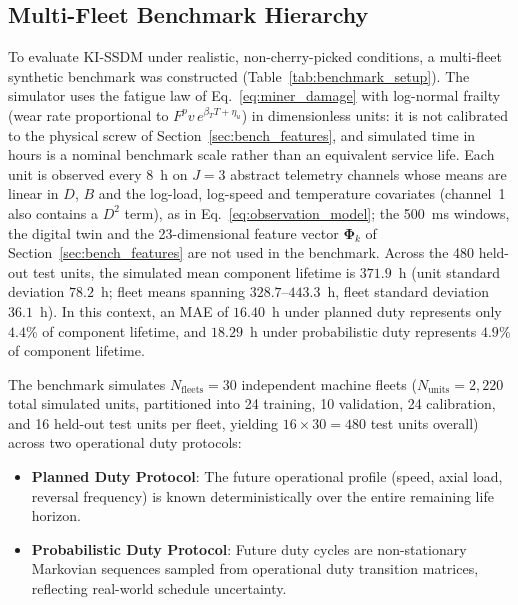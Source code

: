 \documentclass[a4paper,fleqn]{cas-dc}
\newcommand{\bPhi}{\bm{\Phi}}
\begin{document}
\subsection{Multi-Fleet Benchmark Hierarchy}
\label{subsec:fleet_hierarchy}

To evaluate KI-SSDM under realistic, non-cherry-picked conditions, a multi-fleet synthetic benchmark was constructed (Table~\ref{tab:benchmark_setup}). The simulator uses the fatigue law of Eq.~\eqref{eq:miner_damage} with log-normal frailty (wear rate proportional to $F^p v\,e^{\beta_T T + \eta_u}$) in dimensionless units: it is not calibrated to the physical screw of Section~\ref{sec:bench_features}, and simulated time in hours is a nominal benchmark scale rather than an equivalent service life. Each unit is observed every 8~h on $J = 3$ abstract telemetry channels whose means are linear in $D$, $B$ and the log-load, log-speed and temperature covariates (channel~1 also contains a $D^2$ term), as in Eq.~\eqref{eq:observation_model}; the 500~ms windows, the digital twin and the 23-dimensional feature vector $\bPhi_k$ of Section~\ref{sec:bench_features} are not used in the benchmark. Across the 480 held-out test units, the simulated mean component lifetime is $371.9$~h (unit standard deviation $78.2$~h; fleet means spanning $328.7\text{--}443.3$~h, fleet standard deviation $36.1$~h). In this context, an MAE of $16.40$~h under planned duty represents only $4.4\%$ of component lifetime, and $18.29$~h under probabilistic duty represents $4.9\%$ of component lifetime.

The benchmark simulates $N_{\mathrm{fleets}} = 30$ independent machine fleets ($N_{\mathrm{units}} = 2{,}220$ total simulated units, partitioned into 24 training, 10 validation, 24 calibration, and 16 held-out test units per fleet, yielding $16 \times 30 = 480$ test units overall) across two operational duty protocols:
\begin{itemize}[leftmargin=1.5em]
    \item \textbf{Planned Duty Protocol}: The future operational profile (speed, axial load, reversal frequency) is known deterministically over the entire remaining life horizon.
    \item \textbf{Probabilistic Duty Protocol}: Future duty cycles are non-stationary Markovian sequences sampled from operational duty transition matrices, reflecting real-world schedule uncertainty.
\end{itemize}
\end{document}
